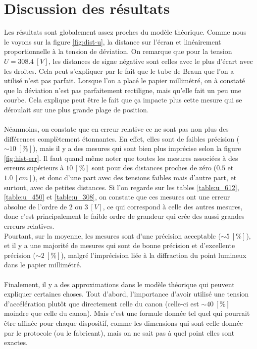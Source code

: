 \documentclass[11pt]{article}
\begin{document}
\section{Discussion des résultats}

Les résultats sont globalement assez proches du modèle théorique. Comme nous le voyons sur la figure \ref{fig:dist-u}, la distance sur l'écran et linéairement proportionnelle à la tension de déviation. On remarque que pour la tension $U = 308.4 \ [V]$, les distances de signe négative sont celles avec le plus d'écart avec les droites. Cela peut s'expliquer par le fait que le tube de Braun que l'on a utilisé n'est pas parfait. Lorsque l'on a placé le papier millimétré, on à constaté que la déviation n'est pas parfaitement rectiligne, mais qu'elle fait un peu une courbe. Cela explique peut être le fait que ça impacte plus cette mesure qui se déroulait sur une plus grande plage de position.\\ \\
Néanmoins, on constate que en erreur relative ce ne sont pas non plus des différences complètement étonnantes. En effet, elles sont de faibles précision ($\sim 10 \ [\%]$), mais il y a des mesures qui sont bien plus imprécise selon la figure \ref{fig:hist-err}. Il faut quand même noter que toutes les mesures associées à des erreurs supérieurs à $10 \ [\%]$ sont pour des distances proches de zéro ($0.5$ et $1.0 \ [cm]$), et donc d'une part avec des tensions faibles mais d'autre part, et surtout, avec de petites distances. Si l'on regarde sur les tables \ref{table:u_612}, \ref{table:u_450} et \ref{table:u_308}, on constate que ces mesures ont une erreur absolue de l'ordre de $2$ ou $3 \ [V]$, ce qui correspond à celle des autres mesures, donc c'est principalement le faible ordre de grandeur qui crée des aussi grandes erreurs relatives.\\
Pourtant, sur la moyenne, les mesures sont d'une précision acceptable ($\sim 5 \ [\%]$), et il y a une majorité de mesures qui sont de bonne précision et d'excellente précision ($\sim 2 \ [\%]$), malgré l'imprécision liée à la diffraction du point lumineux dans le papier millimétré.\\ \\
Finalement, il y a des approximations dans le modèle théorique qui peuvent expliquer certaines choses. Tout d'abord, l'importance d'avoir utilisé une tension d'accélération plutôt que directement celle du canon (celle-ci est $\sim 40 \ [\%]$ moindre que celle du canon). Mais c'est une formule donnée tel quel qui pourrait être affinée pour chaque dispositif, comme les dimensions qui sont celle donnée par le protocole (ou le fabricant), mais on ne sait pas à quel point elles sont exactes. \\
\end{document}
